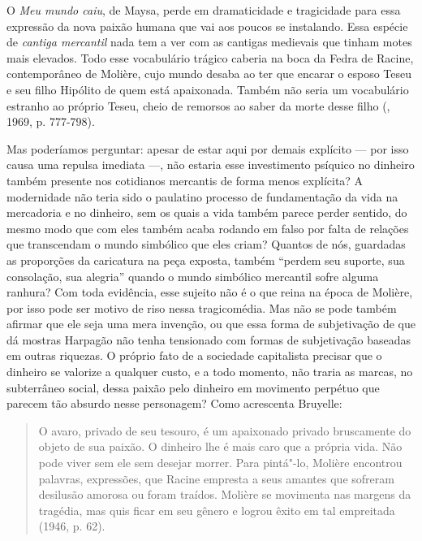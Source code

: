O \emph{Meu mundo caiu}, de Maysa, perde em dramaticidade e tragicidade
para essa expressão da nova paixão humana que vai aos poucos se
instalando. Essa espécie de \emph{cantiga mercantil} nada tem a ver com
as cantigas medievais que tinham motes mais elevados. Todo esse
vocabulário trágico caberia na boca da Fedra de Racine, contemporâneo de
Molière, cujo mundo desaba ao ter que encarar o esposo Teseu e seu filho
Hipólito de quem está apaixonada. Também não seria um vocabulário
estranho ao próprio Teseu, cheio de remorsos ao saber da morte desse
filho (, 1969, p. 777-798).

Mas poderíamos perguntar: apesar de estar aqui por demais explícito ---
por isso causa uma repulsa imediata ---, não estaria esse investimento
psíquico no dinheiro também presente nos cotidianos mercantis de forma
menos explícita? A modernidade não teria sido o paulatino processo de
fundamentação da vida na mercadoria e no dinheiro, sem os quais a vida
também parece perder sentido, do mesmo modo que com eles também acaba
rodando em falso por falta de relações que transcendam o mundo simbólico
que eles criam? Quantos de nós, guardadas as proporções da caricatura na
peça exposta, também ``perdem seu suporte, sua consolação, sua alegria''
quando o mundo simbólico mercantil sofre alguma ranhura? Com toda
evidência, esse sujeito não é o que reina na época de Molière, por isso
pode ser motivo de riso nessa tragicomédia. Mas não se pode também
afirmar que ele seja uma mera invenção, ou que essa forma de
subjetivação de que dá mostras Harpagão não tenha tensionado com formas
de subjetivação baseadas em outras riquezas. O próprio fato de a
sociedade capitalista precisar que o dinheiro se valorize a qualquer
custo, e a todo momento, não traria as marcas, no subterrâneo social,
dessa paixão pelo dinheiro em movimento perpétuo que parecem tão absurdo
nesse personagem? Como acrescenta Bruyelle:

\begin{quote}
O avaro, privado de seu tesouro, é um apaixonado privado bruscamente do
objeto de sua paixão. O dinheiro lhe é mais caro que a própria vida. Não
pode viver sem ele sem desejar morrer. Para pintá"-lo, Molière encontrou
palavras, expressões, que Racine empresta a seus amantes que sofreram
desilusão amorosa ou foram traídos. Molière se movimenta nas margens da
tragédia, mas quis ficar em seu gênero e logrou êxito em tal empreitada
(1946, p. 62).
\end{quote}

